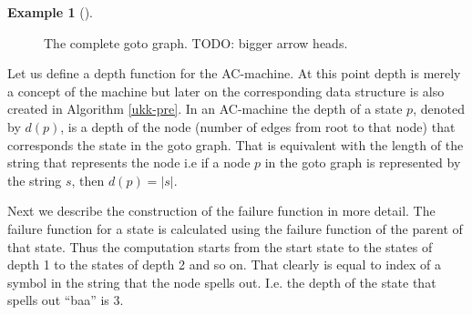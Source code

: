 \documentclass[english,twoside,censored,csm,algorithms-track-2020]{HYthesisML}
\theoremstyle{plain}
\theoremstyle{definition}
\newtheorem{example}[theorem]{Example}
\begin{document}
\begin{example}[]
\begin{figure}[h]
  \caption{The complete goto graph. TODO: bigger arrow heads.} \label{fig-ac-goto}
\end{figure}
  \end{example}
  
  Let us define a depth function for the AC-machine. At this point depth is merely a concept of the
  machine but later on the corresponding data structure is also created in Algorithm \ref{ukk-pre}.
  In an AC-machine the depth of a state $p$, denoted by $d(p)$, is a depth of the node (number of
  edges from root to that node) that corresponds
  the state in the goto graph. That is equivalent with the length of the string that represents the
  node i.e if a node $p$ in the goto graph is represented by the string $s$, then $d(p) = |s|$.
  
  Next we describe the construction of the failure function in more detail. The failure function
  for a state is calculated using the failure function of the parent of that state. Thus the computation
  starts from the start state to the states of depth 1 to the states of depth 2 and so on. That clearly
  is equal to index of a symbol in the string that the node spells out. I.e. the depth of
  the state that spells out ``baa'' is 3.
\end{document}
